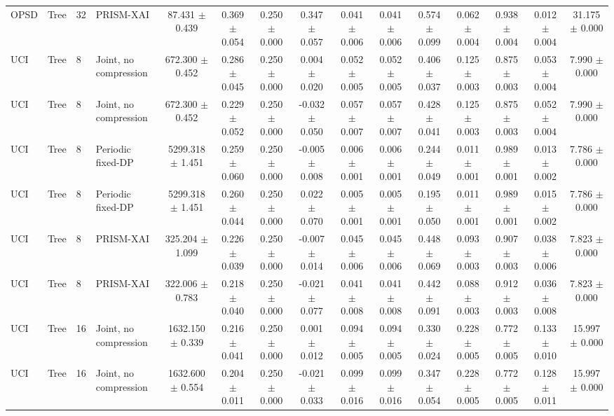 \begin{tabular}{llllccccccccccc}
OPSD & Tree & 32 & PRISM-XAI & 87.431 $\pm$ 0.439 & 0.369 $\pm$ 0.054 & 0.250 $\pm$ 0.000 & 0.347 $\pm$ 0.057 & 0.041 $\pm$ 0.006 & 0.041 $\pm$ 0.006 & 0.574 $\pm$ 0.099 & 0.062 $\pm$ 0.004 & 0.938 $\pm$ 0.004 & 0.012 $\pm$ 0.004 & 31.175 $\pm$ 0.000 \\
UCI & Tree & 8 & Joint, no compression & 672.300 $\pm$ 0.452 & 0.286 $\pm$ 0.045 & 0.250 $\pm$ 0.000 & 0.004 $\pm$ 0.020 & 0.052 $\pm$ 0.005 & 0.052 $\pm$ 0.005 & 0.406 $\pm$ 0.037 & 0.125 $\pm$ 0.003 & 0.875 $\pm$ 0.003 & 0.053 $\pm$ 0.004 & 7.990 $\pm$ 0.000 \\
UCI & Tree & 8 & Joint, no compression & 672.300 $\pm$ 0.452 & 0.229 $\pm$ 0.052 & 0.250 $\pm$ 0.000 & -0.032 $\pm$ 0.050 & 0.057 $\pm$ 0.007 & 0.057 $\pm$ 0.007 & 0.428 $\pm$ 0.041 & 0.125 $\pm$ 0.003 & 0.875 $\pm$ 0.003 & 0.052 $\pm$ 0.004 & 7.990 $\pm$ 0.000 \\
UCI & Tree & 8 & Periodic fixed-DP & 5299.318 $\pm$ 1.451 & 0.259 $\pm$ 0.060 & 0.250 $\pm$ 0.000 & -0.005 $\pm$ 0.008 & 0.006 $\pm$ 0.001 & 0.006 $\pm$ 0.001 & 0.244 $\pm$ 0.049 & 0.011 $\pm$ 0.001 & 0.989 $\pm$ 0.001 & 0.013 $\pm$ 0.002 & 7.786 $\pm$ 0.000 \\
UCI & Tree & 8 & Periodic fixed-DP & 5299.318 $\pm$ 1.451 & 0.260 $\pm$ 0.044 & 0.250 $\pm$ 0.000 & 0.022 $\pm$ 0.070 & 0.005 $\pm$ 0.001 & 0.005 $\pm$ 0.001 & 0.195 $\pm$ 0.050 & 0.011 $\pm$ 0.001 & 0.989 $\pm$ 0.001 & 0.015 $\pm$ 0.002 & 7.786 $\pm$ 0.000 \\
UCI & Tree & 8 & PRISM-XAI & 325.204 $\pm$ 1.099 & 0.226 $\pm$ 0.039 & 0.250 $\pm$ 0.000 & -0.007 $\pm$ 0.014 & 0.045 $\pm$ 0.006 & 0.045 $\pm$ 0.006 & 0.448 $\pm$ 0.069 & 0.093 $\pm$ 0.003 & 0.907 $\pm$ 0.003 & 0.038 $\pm$ 0.006 & 7.823 $\pm$ 0.000 \\
UCI & Tree & 8 & PRISM-XAI & 322.006 $\pm$ 0.783 & 0.218 $\pm$ 0.040 & 0.250 $\pm$ 0.000 & -0.021 $\pm$ 0.077 & 0.041 $\pm$ 0.008 & 0.041 $\pm$ 0.008 & 0.442 $\pm$ 0.091 & 0.088 $\pm$ 0.003 & 0.912 $\pm$ 0.003 & 0.036 $\pm$ 0.008 & 7.823 $\pm$ 0.000 \\
UCI & Tree & 16 & Joint, no compression & 1632.150 $\pm$ 0.339 & 0.216 $\pm$ 0.041 & 0.250 $\pm$ 0.000 & 0.001 $\pm$ 0.012 & 0.094 $\pm$ 0.005 & 0.094 $\pm$ 0.005 & 0.330 $\pm$ 0.024 & 0.228 $\pm$ 0.005 & 0.772 $\pm$ 0.005 & 0.133 $\pm$ 0.010 & 15.997 $\pm$ 0.000 \\
UCI & Tree & 16 & Joint, no compression & 1632.600 $\pm$ 0.554 & 0.204 $\pm$ 0.011 & 0.250 $\pm$ 0.000 & -0.021 $\pm$ 0.033 & 0.099 $\pm$ 0.016 & 0.099 $\pm$ 0.016 & 0.347 $\pm$ 0.054 & 0.228 $\pm$ 0.005 & 0.772 $\pm$ 0.005 & 0.128 $\pm$ 0.011 & 15.997 $\pm$ 0.000 \\

\end{tabular}
